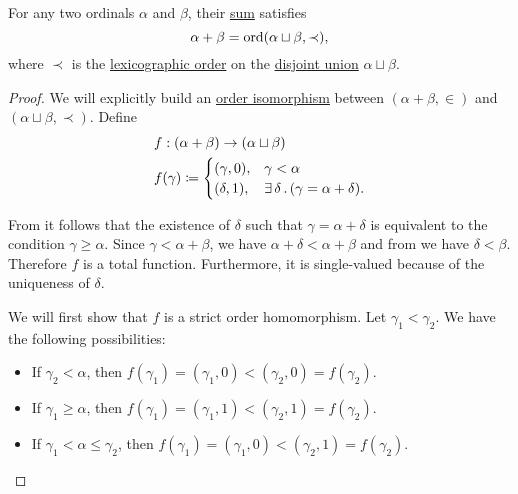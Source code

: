 \begin{proposition}\label{thm:ordinal_addition_disjoin_union}
  For any two ordinals \( \alpha \) and \( \beta \), their \hyperref[def:ordinal_arithmetic/addition]{sum} satisfies
  \begin{equation*}
    \alpha + \beta = \operatorname{ord}(\alpha \sqcup \beta, \prec),
  \end{equation*}
  where \( \prec \) is the \hyperref[def:lexicographic_order]{lexicographic order} on the \hyperref[def:disjoin_union]{disjoint union} \( \alpha \sqcup \beta \).
\end{proposition}
\begin{proof}
  We will explicitly build an \hyperref[def:partially_ordered_set/homomorphism]{order isomorphism} between \( (\alpha + \beta, \in) \) and \( (\alpha \sqcup \beta, \prec) \). Define
  \begin{equation*}
    \begin{aligned}
      &f: (\alpha + \beta) \to (\alpha \sqcup \beta) \\
      &f(\gamma) \coloneqq \begin{cases}
        (\gamma, 0), &\gamma < \alpha \\
        (\delta, 1), &\exists \thinspace \delta \thinspace . \thinspace (\gamma = \alpha + \delta).
      \end{cases}
    \end{aligned}
  \end{equation*}

  From  it follows that the existence of \( \delta \) such that \( \gamma = \alpha + \delta \) is equivalent to the condition \( \gamma \geq \alpha \). Since \( \gamma < \alpha + \beta \), we have \( \alpha + \delta < \alpha + \beta \) and from  we have \( \delta < \beta \). Therefore \( f \) is a total function. Furthermore, it is single-valued because of the uniqueness of \( \delta \).

  We will first show that \( f \) is a strict order homomorphism. Let \( \gamma_1 < \gamma_2 \). We have the following possibilities:
  \begin{itemize}
    \item If \( \gamma_2 < \alpha \), then \( f(\gamma_1) = (\gamma_1, 0) < (\gamma_2, 0) = f(\gamma_2) \).
    \item If \( \gamma_1 \geq \alpha \), then \( f(\gamma_1) = (\gamma_1, 1) < (\gamma_2, 1) = f(\gamma_2) \).
    \item If \( \gamma_1 < \alpha \leq \gamma_2 \), then \( f(\gamma_1) = (\gamma_1, 0) < (\gamma_2, 1) = f(\gamma_2) \).
  \end{itemize}


\end{proof}
